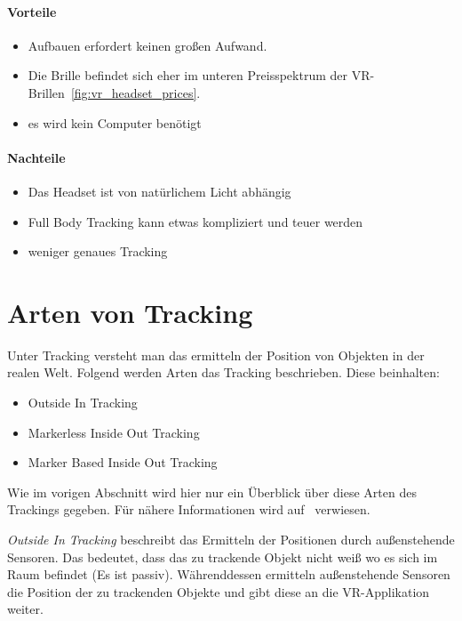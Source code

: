\paragraph{Vorteile}

\begin{itemize}
    \item Aufbauen erfordert keinen großen Aufwand.
    \item Die Brille befindet sich eher im unteren Preisspektrum der VR-Brillen~\ref{fig:vr_headset_prices}.
    \item es wird kein Computer benötigt
\end{itemize}

\paragraph{Nachteile}

\begin{itemize}
    \item Das Headset ist von natürlichem Licht abhängig~\cite{Dennis_Ziesecke_2019}
    \item Full Body Tracking kann etwas kompliziert und teuer werden~\cite{Martin_Rakver}
    \item weniger genaues Tracking~\cite{Macedo_2020}
\end{itemize}

\section{Arten von Tracking}

Unter Tracking versteht man das ermitteln der Position von Objekten in der realen Welt.
Folgend werden Arten das Tracking beschrieben.
Diese beinhalten:

\begin{itemize}
    \item Outside In Tracking
    \item Markerless Inside Out Tracking
    \item Marker Based Inside Out Tracking
\end{itemize}

Wie im vorigen Abschnitt wird hier nur ein Überblick über diese Arten des Trackings gegeben.
Für nähere Informationen wird auf~\cite{Dennis_Ziesecke_2019} verwiesen.

\emph{Outside In Tracking} beschreibt das Ermitteln der Positionen durch außenstehende Sensoren.
Das bedeutet, dass das zu trackende Objekt nicht weiß wo es sich im Raum befindet (Es ist passiv).
Währenddessen ermitteln außenstehende Sensoren die Position der zu trackenden Objekte und gibt diese an die VR-Applikation weiter.

